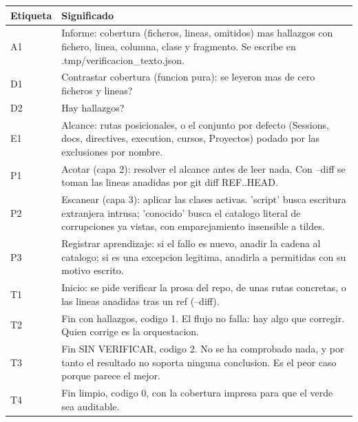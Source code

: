 \documentclass[11pt,a4paper]{article}
\begin{document}
\vspace{6pt}
\begin{tcolorbox}[cajaContenido, title={\faIcon{table}~Leyenda de etiquetas}]
\small
\begin{tabularx}{\linewidth}{@{}>{\centering\arraybackslash}p{1.4cm}X@{}}
\toprule
\textbf{Etiqueta} & \textbf{Significado} \\ \midrule
A1 & Informe: cobertura (ficheros, lineas, omitidos) mas hallazgos con fichero, linea, columna, clase y fragmento. Se escribe en .tmp/verificacion\_texto.json. \\
D1 & Contrastar cobertura (funcion pura): se leyeron mas de cero ficheros y lineas? \\
D2 & Hay hallazgos? \\
E1 & Alcance: rutas posicionales, o el conjunto por defecto (Sessions, docs, directives, execution, cursos, Proyectos) podado por las exclusiones por nombre. \\
P1 & Acotar (capa 2): resolver el alcance antes de leer nada. Con --diff se toman las lineas anadidas por git diff REF..HEAD. \\
P2 & Escanear (capa 3): aplicar las clases activas. 'script' busca escritura extranjera intrusa; 'conocido' busca el catalogo literal de corrupciones ya vistas, con emparejamiento insensible a tildes. \\
P3 & Registrar aprendizaje: si el fallo es nuevo, anadir la cadena al catalogo; si es una excepcion legitima, anadirla a permitidas con su motivo escrito. \\
T1 & Inicio: se pide verificar la prosa del repo, de unas rutas concretas, o las lineas anadidas tras un ref (--diff). \\
T2 & Fin con hallazgos, codigo 1. El flujo no falla: hay algo que corregir. Quien corrige es la orquestacion. \\
T3 & Fin SIN VERIFICAR, codigo 2. No se ha comprobado nada, y por tanto el resultado no soporta ninguna conclusion. Es el peor caso porque parece el mejor. \\
T4 & Fin limpio, codigo 0, con la cobertura impresa para que el verde sea auditable. \\
\bottomrule
\end{tabularx}
\end{tcolorbox}
\end{document}
